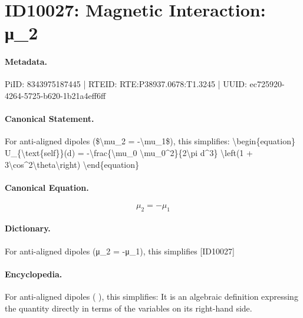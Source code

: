 \section*{ID10027: Magnetic Interaction: μ\_2}
\paragraph{Metadata.}
PiID: 8343975187445 | RTEID: RTE:P38937.0678:T1.3245 | UUID: ec725920-4264-5725-b620-1b21a4eff6ff

\paragraph{Canonical Statement.}
For anti-aligned dipoles (\$\textbackslash{}mu\_2 = -\textbackslash{}mu\_1\$), this simplifies: \textbackslash{}begin\{equation\} U\_\{\textbackslash{}text\{self\}\}(d) = -\textbackslash{}frac\{\textbackslash{}mu\_0 \textbackslash{}mu\_0\textasciicircum{}2\}\{2\textbackslash{}pi d\textasciicircum{}3\} \textbackslash{}left(1 + 3\textbackslash{}cos\textasciicircum{}2\textbackslash{}theta\textbackslash{}right) \textbackslash{}end\{equation\}

\paragraph{Canonical Equation.}
\[
\mu_2 = -\mu_1
\]

\paragraph{Dictionary.}
For anti-aligned dipoles (μ\_2 = -μ\_1), this simplifies [ID10027]

\paragraph{Encyclopedia.}
For anti-aligned dipoles ( ), this simplifies: It is an algebraic definition expressing the quantity directly in terms of the variables on its right-hand side.
